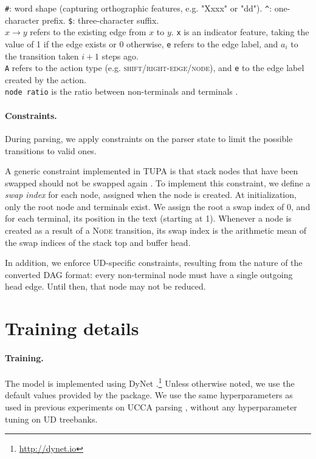 \documentclass[11pt,a4paper]{article}
\begin{document}
\begin{table}[h]
{\texttt{\#}: word shape (capturing orthographic features, e.g. "Xxxx" or "dd").
\texttt{\^{}}: one-character prefix.
\texttt{\$}: three-character suffix.\\
$x \to y$ refers to the existing edge from $x$ to $y$.
\texttt{x} is an indicator feature, taking the value of 1 if the edge exists or 0 otherwise,
\texttt{e} refers to the edge label, and
$a_i$ to the transition taken $i+1$ steps ago.\\
\texttt{A} refers to the action type (e.g. \textsc{shift}/\textsc{right-edge}/\textsc{node}), and
\texttt{e} to the edge label created by the action.\\
\texttt{node ratio} is the ratio between non-terminals and terminals \cite{hershcovich2017a}.}
\end{table}

\paragraph{Constraints.}
During parsing, we apply constraints on the parser state
to limit the possible transitions to valid ones.

A generic constraint implemented in TUPA is that stack nodes 
that have been swapped
should not be swapped again \cite{hershcovich2018multitask}.
 To implement this constraint, we define a \textit{swap index}
 for each node, assigned when the node is created.
 At initialization, only the root node and terminals exist.
 We assign the root a swap index of 0, and for each terminal, its
 position in the text (starting at 1).
 Whenever a node is created as a result of a \textsc{Node}
 transition, its swap index is the arithmetic
 mean of the swap indices of the stack top and buffer head.
 
In addition, we enforce UD-specific constraints, resulting from
the nature of the converted DAG format:
every non-terminal node must have a single outgoing \textrm{head} edge.
Until then, that node may not be reduced.


\section{Training details}\label{sec:details}

\paragraph{Training.}

The model is implemented using DyNet \cite{neubig2017dynet}.\footnote{\url{http://dynet.io}}
Unless otherwise noted, we use the default values provided by the package.
We use the same hyperparameters as used in previous experiments on UCCA
parsing \cite{hershcovich2018multitask},
without any hyperparameter tuning on UD treebanks.
\end{document}
